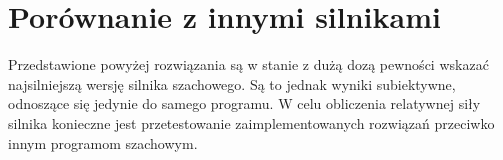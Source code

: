 \newpage
\section {Porównanie z innymi silnikami}
\label {sec: porownianie-z-silnikami}

Przedstawione powyżej rozwiązania są w stanie z dużą dozą pewności wskazać najsilniejszą wersję silnika szachowego.
Są to jednak wyniki subiektywne, odnoszące się jedynie do samego programu.
W celu obliczenia relatywnej siły silnika konieczne jest przetestowanie zaimplementowanych rozwiązań przeciwko innym programom szachowym.


